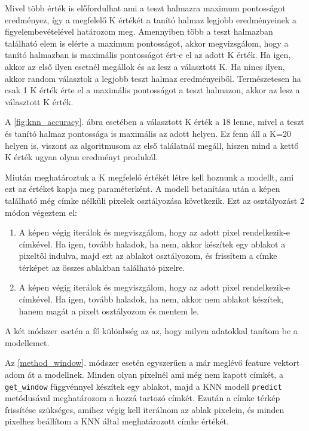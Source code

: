Mivel több érték is előfordulhat ami a teszt halmazra maximum pontosságot eredményez, így a megfelelő K értékét a tanító halmaz legjobb eredményeinek a figyelembevételével határozom meg. Amennyiben több a teszt halmazban található elem is elérte a maximum pontosságot, akkor megvizsgálom, hogy a tanító halmazban is maximális pontosságot ért-e el az adott K érték. Ha igen, akkor az első ilyen esetnél megállok és az lesz a választott K. Ha nincs ilyen, akkor random választok a legjobb teszt halmaz eredményeiből. Természetesen ha csak 1 K érték érte el a maximális pontosságot a teszt halmazon, akkor az lesz a választott K érték.

A \ref{fig:knn_accuracy}. ábra esetében a választott K érték a 18 lenne, mivel a teszt és tanító halmaz pontossága is maximális az adott helyen. Ez fenn áll a K=20 helyen is, viszont az algoritmusom az első találatnál megáll, hiszen mind a kettő K érték ugyan olyan eredményt produkál.

Miután meghatároztuk a K megfelelő értékét létre kell hoznunk a modellt, ami ezt az értéket kapja meg paraméterként. A modell betanítása után a képen található még címke nélküli pixelek osztályozása következik. Ezt az osztályozást 2 módon végeztem el:
\begin{enumerate}
\item \label{method_window} A képen végig iterálok és megviszgálom, hogy az adott pixel rendelkezik-e címkével. Ha igen, tovább haladok, ha nem, akkor készítek egy ablakot a pixeltől indulva, majd ezt az ablakot osztályozom, és frissítem a címke térképet az összes ablakban található pixelre.
\item \label{method_pixel} A képen végig iterálok és megviszgálom, hogy az adott pixel rendelkezik-e címkével. Ha igen, tovább haladok, ha nem, akkor nem ablakot készítek, hanem magát a pixelt osztályozom és mentem le.
\end{enumerate}

A két módszer esetén a fő különbség az az, hogy milyen adatokkal tanítom be a modellemet. 

Az \ref{method_window}. módszer esetén egyszerűen a már meglévő feature vektort adom át a modellnek. Minden olyan pixelnél ami még nem kapott címkét, a \texttt{get\_window} függvénnyel készítek egy ablakot, majd a KNN modell \texttt{predict} metódusával meghatározom a hozzá tartozó címkét. Ezután a címke térkép frissítése szükséges, amihez végig kell iterálnom az ablak pixelein, és minden pixelhez beállítom a KNN által meghatározott címke értékét.

